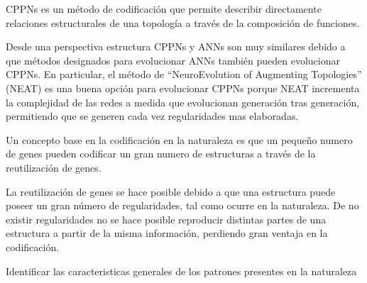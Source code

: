 CPPNs es un método de codificación que permite describir directamente relaciones estructurales de una topología a través de la composición de funciones.

Desde una perspectiva estructura CPPNs y ANNs son muy similares debido a que métodos designados para evolucionar ANNs también pueden evolucionar CPPNs. En particular, el método de ``NeuroEvolution of Augmenting Topologies'' (NEAT) es una buena opción para evolucionar CPPNs porque NEAT incrementa la complejidad de las redes a medida que evolucionan generación tras generación, permitiendo que se generen cada vez regularidades mas elaboradas.

Un concepto base en la codificación en la naturaleza es que un pequeño numero de genes pueden codificar un gran numero de estructuras a través de la reutilización de genes.

La reutilización de genes se hace posible debido a que una estructura puede poseer un gran número de regularidades, tal como ocurre en la naturaleza. De no existir regularidades no se hace posible reproducir distintas partes de una estructura a partir de la misma información, perdiendo gran ventaja en la codificación. 

Identificar las caracteristicas generales de los patrones presentes en la naturaleza 

